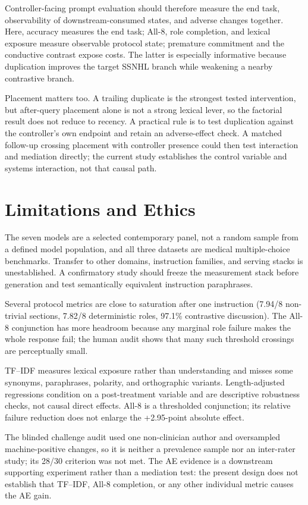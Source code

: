 \documentclass[10pt]{article}
\begin{document}
Controller-facing prompt evaluation should therefore measure the end task, observability of downstream-consumed states, and adverse changes together. Here, accuracy measures the end task; All-8, role completion, and lexical exposure measure observable protocol state; premature commitment and the conductive contrast expose costs. The latter is especially informative because duplication improves the target SSNHL branch while weakening a nearby contrastive branch.

Placement matters too. A trailing duplicate is the strongest tested intervention, but after-query placement alone is not a strong lexical lever, so the factorial result does not reduce to recency. A practical rule is to test duplication against the controller's own endpoint and retain an adverse-effect check. A matched follow-up crossing placement with controller presence could then test interaction and mediation directly; the current study establishes the control variable and systems interaction, not that causal path.

\section{Limitations and Ethics}
The seven models are a selected contemporary panel, not a random sample from a defined model population, and all three datasets are medical multiple-choice benchmarks. Transfer to other domains, instruction families, and serving stacks is unestablished. A confirmatory study should freeze the measurement stack before generation and test semantically equivalent instruction paraphrases.

Several protocol metrics are close to saturation after one instruction (7.94/8 non-trivial sections, 7.82/8 deterministic roles, 97.1\% contrastive discussion). The All-8 conjunction has more headroom because any marginal role failure makes the whole response fail; the human audit shows that many such threshold crossings are perceptually small.

TF--IDF measures lexical exposure rather than understanding and misses some synonyms, paraphrases, polarity, and orthographic variants. Length-adjusted regressions condition on a post-treatment variable and are descriptive robustness checks, not causal direct effects. All-8 is a thresholded conjunction; its relative failure reduction does not enlarge the +2.95-point absolute effect.

The blinded challenge audit used one non-clinician author and oversampled machine-positive changes, so it is neither a prevalence sample nor an inter-rater study; its 28/30 criterion was not met. The AE evidence is a downstream supporting experiment rather than a mediation test: the present design does not establish that TF--IDF, All-8 completion, or any other individual metric causes the AE gain.
\end{document}
